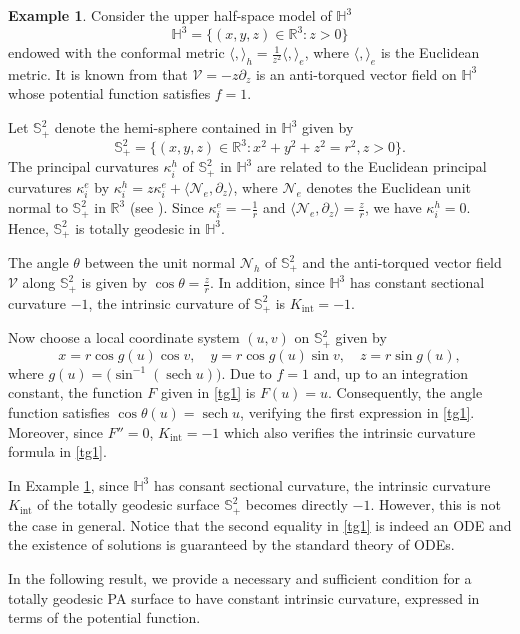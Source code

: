 \documentclass[12pt,reqno]{amsart}
\def\r{\mathbb R}
\def\s{\mathbb S}
\def\h{\mathbb H}
\def\v{\mathcal V}
\def\n{\mathcal N}
\DeclareMathOperator{\sech}{sech}
\theoremstyle{definition}
\newtheorem{example}[theorem]{Example}
\begin{document}
\begin{example}\label{htg}
Consider the upper half-space model of $\h^3$
$$
\h^3=\{(x,y,z)\in \r^3:z>0\}
$$
endowed with the conformal metric $\langle,\rangle_h=\frac{1}{z^2}\langle,\rangle_e$, where $\langle,\rangle_e$ is the Euclidean metric. It is known from \cite{amc} that $\v=-z\partial_z$ is an anti-torqued vector field on $\h^3$ whose potential function satisfies $f=1$.

Let $\s^2_+$ denote  the hemi-sphere contained in $\h^3$ given by
$$
\s^2_+=\{(x,y,z)\in \r^3:x^2+y^2+z^2=r^2,z>0\}.
$$
The principal curvatures $\kappa_i^h$ of $\s^2_+$ in $\h^3$ are related to the Euclidean principal curvatures $\kappa_i^e$ by $\kappa_i^h=z\kappa_i^e+\langle \n_e,\partial_z\rangle$, where $\n_e$ denotes the Euclidean unit normal to $\s^2_+$ in $\r^3$ (see \cite{gss}). Since $\kappa_i^e=-\frac1r$ and $\langle \n_e,\partial_z\rangle=\frac{z}{r}$, we have $\kappa_i^h=0$. Hence, $\s^2_+$ is totally geodesic in $\h^3$. 

The angle $\theta$ between the unit normal $\n_h$ of $\s^2_+$ and the anti-torqued vector field $\v$ along $\s^2_+$ is given by $\cos\theta=\frac{z}{r}$. In addition, since $\h^3$ has constant sectional curvature $-1$, the intrinsic curvature of $\s^2_+$ is $K_{\mathrm{int}}=-1$.

Now choose a local coordinate system $(u,v)$ on $\s^2_+$ given by
$$
x=r\cos g(u)\cos v, \quad y=r\cos g(u)\sin v, \quad z=r\sin g(u),
$$
where $g(u)=\big(\sin^{-1}(\sech u)\big)$. Due to $f=1$ and, up to an integration constant, the function $F$ given in \eqref{tg1} is $F(u)=u$. Consequently, the angle function satisfies $\cos\theta(u)=\sech u$, verifying the first expression in \eqref{tg1}. Moreover, since $F''=0$, $K_{\mathrm{int}}=-1$ which also verifies the intrinsic curvature formula in \eqref{tg1}.
\end{example}

In Example \ref{htg}, since $\h^3$ has consant sectional curvature, the intrinsic curvature $K_{\mathrm{int}}$ of the totally geodesic surface $\s^2_+$ becomes directly $-1$. However, this is not the case in general. Notice that the second equality in \eqref{tg1} is indeed an ODE and the existence of solutions is guaranteed by the standard theory of ODEs.

In the following result, we provide a necessary and sufficient condition for a totally geodesic PA surface to have constant intrinsic curvature, expressed in terms of the potential function.
\end{document}
